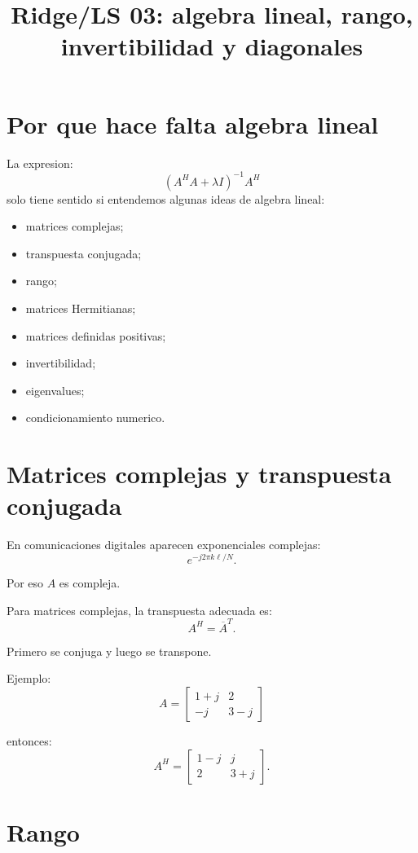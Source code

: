 \documentclass[11pt]{article}
\title{Ridge/LS 03: algebra lineal, rango, invertibilidad y diagonales}
\author{}
\date{}
\begin{document}
\maketitle

\section{Por que hace falta algebra lineal}

La expresion:
\[
    (A^H A + \lambda I)^{-1}A^H
\]
solo tiene sentido si entendemos algunas ideas de algebra lineal:

\begin{itemize}
    \item matrices complejas;
    \item transpuesta conjugada;
    \item rango;
    \item matrices Hermitianas;
    \item matrices definidas positivas;
    \item invertibilidad;
    \item eigenvalues;
    \item condicionamiento numerico.
\end{itemize}

\section{Matrices complejas y transpuesta conjugada}

En comunicaciones digitales aparecen exponenciales complejas:
\[
    e^{-j2\pi k\ell/N}.
\]

Por eso \(A\) es compleja.

Para matrices complejas, la transpuesta adecuada es:
\[
    A^H = \overline{A}^T.
\]

Primero se conjuga y luego se transpone.

Ejemplo:
\[
A =
\begin{bmatrix}
    1+j & 2\\
    -j & 3-j
\end{bmatrix}
\]

entonces:
\[
A^H =
\begin{bmatrix}
    1-j & j\\
    2 & 3+j
\end{bmatrix}.
\]

\section{Rango}
\end{document}
